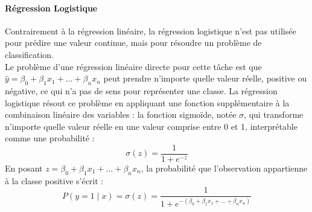 \documentclass[a4paper,12pt, oneside]{article}
\begin{document}
\paragraph{Régression Logistique\\}
Contrairement à la régression linéaire, la régression logistique n'est pas utilisée pour prédire une valeur continue, mais pour résoudre un problème de classification.\\
Le problème d'une régression linéaire directe pour cette tâche est que $ \hat{y} = \beta_0 + \beta_1 x_1 + \dots + \beta_n x_n $ peut prendre n'importe quelle valeur réelle, positive ou négative, ce qui n'a pas de sens pour représenter une classe. La régression logistique résout ce problème en appliquant une fonction supplémentaire à la combinaison linéaire des variables : la fonction sigmoïde, notée $ \sigma $, qui transforme n'importe quelle valeur réelle en une valeur comprise entre 0 et 1, interprétable comme une probabilité :
\[
\sigma(z) = \frac{1}{1 + e^{-z}}
\]
En posant $ z = \beta_0 + \beta_1 x_1 + \dots + \beta_n x_n $, la probabilité que l'observation appartienne à la classe positive s'écrit :
\[
P(y = 1 \mid x) = \sigma(z) = \frac{1}{1 + e^{-(\beta_0 + \beta_1 x_1 + \dots + \beta_n x_n)}}
\]
\end{document}
